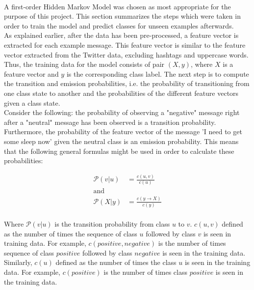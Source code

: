 
 \\

A first-order Hidden Markov Model was chosen as most appropriate for the purpose of this project. This section summarizes the steps which were taken in order to train the model and predict classes for unseen examples afterwards. \\

\noindent As explained earlier, after the data has been pre-processed, a feature vector is extracted for each example message. This feature vector is similar to the feature vector extracted from the Twitter data, excluding hashtags and uppercase words. Thus, the training data for the model consists of pair $(X, y)$, where $X$ is a feature vector and $y$ is the corresponding class label. The next step is to compute the transition and emission probabilities, i.e. the probability of transitioning from one class state to another and the probabilities of the different feature vectors given a class state. \\

\noindent  Consider the following: the probability of observing a "negative" message right after a "neutral" message has been observed is a transition probability. Furthermore, the probability of the feature vector of the message 'I need to get some sleep now' given the neutral class is an emission probability. This means that the following general formulas might be used in order to calculate these probabilities:


\begin{align*}
\mathcal{P}(v | u) & = \frac{c(u, v)}{c(u)}\\
\text{and}\\
\mathcal{P}(X | y) & = \frac{c(y \rightarrow X)}{c(y)}\\
\end{align*}

Where $\mathcal{P}(v | u)$ is the transition probability from class $u$ to $v$.
$c(u, v)$ defined as the number of times the sequence of class $u$ followed by class $v$ is seen in training data.
For example, $c(positive, negative)$ is the number of times sequence of class $positive$ followed by class $negative$ is seen in the training data.
Similarly, $c(u)$ defined as the number of times the class $u$ is seen in the training data.
For example, $c(positive)$ is the number of times class $positive$ is seen in the training data.

